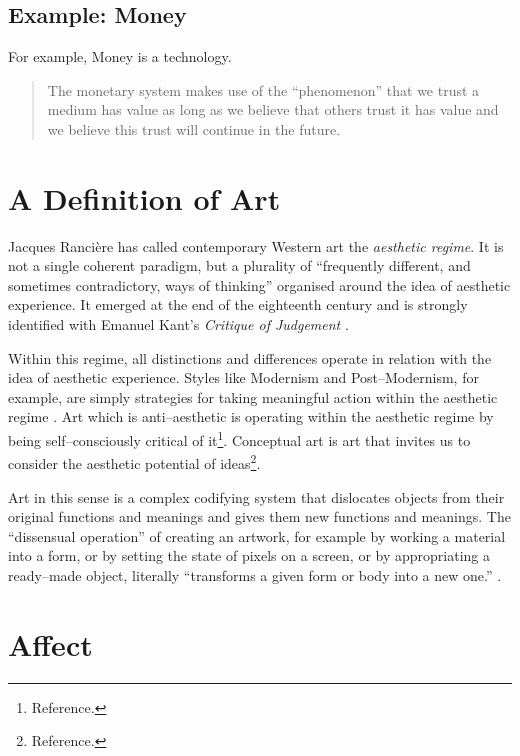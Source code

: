 \documentclass[letter:wpaper]{article}
\begin{document}
    \subsection{Example: Money}

    For example, Money is a technology.

    \begin{quote}
        The monetary system makes use of the ``phenomenon'' that we trust a medium has value as long as we believe that others trust it has value and we believe this trust will continue in the future. \citep[p.55]{theNatureOfTechnology2009}
    \end{quote}

\section{A Definition of Art}

    Jacques Rancière has called contemporary Western art the \emph{aesthetic regime}. It is not a single coherent paradigm, but a plurality of ``frequently different, and sometimes contradictory, ways of thinking'' \citep[p.8]{RanciereMdrnTms2022} organised around the idea of aesthetic experience. It emerged at the end of the eighteenth century and is strongly identified with Emanuel Kant's \emph{Critique of Judgement} \citep[pp.23–24]{RancierPltcsOfThAsthtcs2004}. 

    Within this regime, all distinctions and differences operate in relation with the idea of aesthetic experience. Styles like Modernism and Post–Modernism, for example, are simply strategies for taking meaningful action within the aesthetic regime \citep[p213]{ZepkeSblmArt2017}. Art which is anti–aesthetic is operating within the aesthetic regime by being self–consciously critical of it\footnote{
        Reference.
    }. Conceptual art is art that invites us to consider the aesthetic potential of ideas\footnote{
        Reference.
    }.

    Art in this sense is a complex codifying system that dislocates objects from their original functions and meanings and gives them new functions and meanings. The ``dissensual operation'' of creating an artwork, for example by working a material into a form, or by setting the state of pixels on a screen, or by appropriating a ready–made object, literally ``transforms a given form or body into a new one.'' \citep[p.54]{RancierThEmncptdSpcttr2009}.

\section{Affect}
\end{document}
